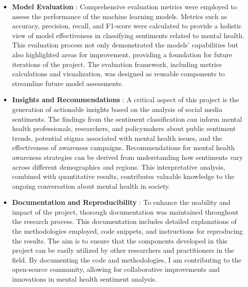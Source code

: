 \begin{itemize}
    \item \textbf{Model Evaluation} :
    \noindent
    Comprehensive evaluation metrics were employed to assess the performance of the machine learning models. Metrics such as accuracy, precision, recall, and F1-score were calculated to provide a holistic view of model effectiveness in classifying sentiments related to mental health. This evaluation process not only demonstrated the models' capabilities but also highlighted areas for improvement, providing a foundation for future iterations of the project. The evaluation framework, including metrics calculations and visualization, was designed as reusable components to streamline future model assessments.
    \item \textbf{Insights and Recommendations} :
    \noindent
    A critical aspect of this project is the generation of actionable insights based on the analysis of social media sentiments. The findings from the sentiment classification can inform mental health professionals, researchers, and policymakers about public sentiment trends, potential stigma associated with mental health issues, and the effectiveness of awareness campaigns. Recommendations for mental health awareness strategies can be derived from understanding how sentiments vary across different demographics and regions. This interpretative analysis, combined with quantitative results, contributes valuable knowledge to the ongoing conversation about mental health in society.
    \item \textbf{Documentation and Reproducibility} :
    \noindent
    To enhance the usability and impact of the project, thorough documentation was maintained throughout the research process. This documentation includes detailed explanations of the methodologies employed, code snippets, and instructions for reproducing the results. The aim is to ensure that the components developed in this project can be easily utilized by other researchers and practitioners in the field. By documenting the code and methodologies, I am contributing to the open-source community, allowing for collaborative improvements and innovations in mental health sentiment analysis.
\end{itemize}


